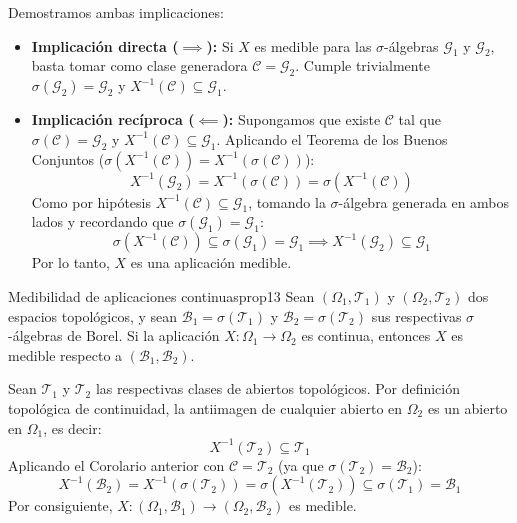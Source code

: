 \begin{demostracion}
Demostramos ambas implicaciones:
\begin{itemize}
    \item \textbf{Implicación directa ($\implies$):}
    Si $X$ es medible para las $\sigma$-álgebras $\mathcal{G}_1$ y $\mathcal{G}_2$, basta tomar como clase generadora $\mathcal{C} = \mathcal{G}_2$. Cumple trivialmente $\sigma(\mathcal{G}_2) = \mathcal{G}_2$ y $X^{-1}(\mathcal{C}) \subseteq \mathcal{G}_1$.
    
    \item \textbf{Implicación recíproca ($\impliedby$):}
    Supongamos que existe $\mathcal{C}$ tal que $\sigma(\mathcal{C}) = \mathcal{G}_2$ y $X^{-1}(\mathcal{C}) \subseteq \mathcal{G}_1$. Aplicando el Teorema de los Buenos Conjuntos ($\sigma(X^{-1}(\mathcal{C})) = X^{-1}(\sigma(\mathcal{C}))$):
    \[
        X^{-1}(\mathcal{G}_2) = X^{-1}(\sigma(\mathcal{C})) = \sigma\left( X^{-1}(\mathcal{C}) \right)
    \]
    Como por hipótesis $X^{-1}(\mathcal{C}) \subseteq \mathcal{G}_1$, tomando la $\sigma$-álgebra generada en ambos lados y recordando que $\sigma(\mathcal{G}_1) = \mathcal{G}_1$:
    \[
        \sigma\left( X^{-1}(\mathcal{C}) \right) \subseteq \sigma(\mathcal{G}_1) = \mathcal{G}_1 \implies X^{-1}(\mathcal{G}_2) \subseteq \mathcal{G}_1
    \]
    Por lo tanto, $X$ es una aplicación medible.
\end{itemize}
\end{demostracion}

\begin{proposicion}{Medibilidad de aplicaciones continuas}{prop13}
Sean $(\Omega_1, \mathcal{T}_1)$ y $(\Omega_2, \mathcal{T}_2)$ dos espacios topológicos, y sean $\mathcal{B}_1 = \sigma(\mathcal{T}_1)$ y $\mathcal{B}_2 = \sigma(\mathcal{T}_2)$ sus respectivas $\sigma$-álgebras de Borel. Si la aplicación $X : \Omega_1 \to \Omega_2$ es continua, entonces $X$ es medible respecto a $(\mathcal{B}_1, \mathcal{B}_2)$.
\end{proposicion}

\begin{demostracion}
Sean $\mathcal{T}_1$ y $\mathcal{T}_2$ las respectivas clases de abiertos topológicos. Por definición topológica de continuidad, la antiimagen de cualquier abierto en $\Omega_2$ es un abierto en $\Omega_1$, es decir:
\[
    X^{-1}(\mathcal{T}_2) \subseteq \mathcal{T}_1
\]
Aplicando el Corolario anterior con $\mathcal{C} = \mathcal{T}_2$ (ya que $\sigma(\mathcal{T}_2) = \mathcal{B}_2$):
\[
    X^{-1}(\mathcal{B}_2) = X^{-1}(\sigma(\mathcal{T}_2)) = \sigma\left( X^{-1}(\mathcal{T}_2) \right) \subseteq \sigma(\mathcal{T}_1) = \mathcal{B}_1
\]
Por consiguiente, $X : (\Omega_1, \mathcal{B}_1) \to (\Omega_2, \mathcal{B}_2)$ es medible.
\end{demostracion}

